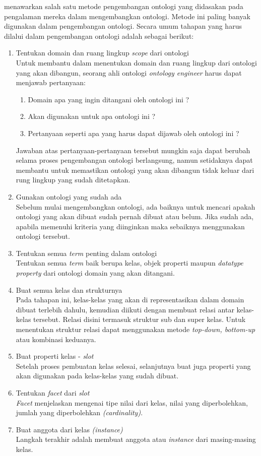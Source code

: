 \citet{noy_mcguinness} menawarkan salah satu metode pengembangan ontologi yang didasakan pada pengalaman mereka dalam mengembangkan ontologi. Metode ini paling banyak digunakan dalam pengembangan ontologi. Secara umum tahapan yang harus dilalui dalam pengembangan ontologi adalah sebagai berikut:
\begin{enumerate}
	\item Tentukan domain dan ruang lingkup \emph{scope} dari ontologi\\
	Untuk membantu dalam menentukan domain dan ruang lingkup dari ontologi yang akan dibangun, seorang ahli ontologi \emph{ontology engineer} harus dapat menjawab pertanyaan:
	\begin{enumerate}
		\item Domain apa yang ingin ditangani oleh ontologi ini ?
		\item Akan digunakan untuk apa ontologi ini ?
		\item Pertanyaan seperti apa yang harus dapat dijawab oleh ontologi ini ?
	\end{enumerate}
	Jawaban atas pertanyaan-pertanyaan tersebut mungkin saja dapat berubah selama proses pengembangan ontologi berlangsung, namun setidaknya dapat membantu untuk memastikan ontologi yang akan dibangun tidak keluar dari rung lingkup yang sudah ditetapkan.
	\item Gunakan ontologi yang sudah ada\\
	Sebelum mulai mengembangkan ontologi, ada baiknya untuk mencari apakah ontologi yang akan dibuat sudah pernah dibuat atau belum. Jika sudah ada, apabila memenuhi kriteria yang diinginkan maka sebaiknya menggunakan ontologi tersebut.
	\item Tentukan semua \emph{term} penting dalam ontologi\\
	Tentukan semua \emph{term} baik berupa kelas, objek properti maupun \emph{datatype property} dari ontologi domain yang akan ditangani.
	\item Buat semua kelas dan strukturnya\\
	Pada tahapan ini, kelas-kelas yang akan di representasikan dalam domain dibuat terlebih dahulu, kemudian diikuti dengan membuat relasi antar kelas-kelas tersebut. Relasi disini termasuk struktur sub dan super kelas. Untuk menentukan struktur relasi dapat menggunakan metode \emph{top-down, bottom-up} atau kombinasi keduanya.
	\item Buat properti kelas - \emph{slot}\\
	Setelah proses pembuatan kelas selesai, selanjutnya buat juga properti yang akan digunakan pada kelas-kelas yang sudah dibuat.
	\item Tentukan \emph{facet} dari \emph{slot}\\
	\emph{Facet} menjelaskan mengenai tipe nilai dari kelas, nilai yang diperbolehkan, jumlah yang diperbolehkan \emph{(cardinality)}.
	\item Buat anggota dari kelas \emph{(instance)}\\
	Langkah terakhir adalah membuat anggota atau \emph{instance} dari masing-masing kelas.
\end{enumerate}
